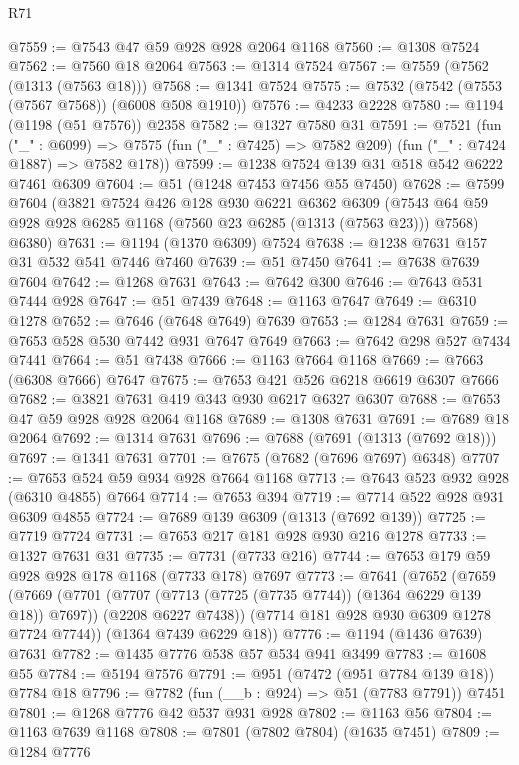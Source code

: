 \begin{lexlean}{R71}
\begin{coremodule}
@7559 := @7543 @47 @59 @928 @928 @2064 @1168
@7560 := @1308 @7524
@7562 := @7560 @18 @2064
@7563 := @1314 @7524
@7567 := @7559 (@7562 (@1313 (@7563 @18)))
@7568 := @1341 @7524
@7575 := @7532 (@7542 (@7553 (@7567 @7568)) (@6008 @508 @1910))
@7576 := @4233 @2228
@7580 := @1194 (@1198 (@51 @7576)) @2358
@7582 := @1327 @7580 @31
@7591 := @7521
    (fun ("_" : @6099) =>
    @7575 (fun ("_" : @7425) => @7582 @209) (fun ("_" : @7424 @1887) => @7582 @178))
@7599 := @1238 @7524 @139 @31 @518 @542 @6222 @7461 @6309
@7604 := @51 (@1248 @7453 @7456 @55 @7450)
@7628 := @7599
    @7604
    (@3821
      @7524
      @426
      @128
      @930
      @6221
      @6362
      @6309
      (@7543 @64 @59 @928 @928 @6285 @1168 (@7560 @23 @6285 (@1313 (@7563 @23))) @7568)
      @6380)
@7631 := @1194 (@1370 @6309) @7524
@7638 := @1238 @7631 @157 @31 @532 @541 @7446 @7460
@7639 := @51 @7450
@7641 := @7638 @7639 @7604
@7642 := @1268 @7631
@7643 := @7642 @300
@7646 := @7643 @531 @7444 @928
@7647 := @51 @7439
@7648 := @1163 @7647
@7649 := @6310 @1278
@7652 := @7646 (@7648 @7649) @7639
@7653 := @1284 @7631
@7659 := @7653 @528 @530 @7442 @931 @7647 @7649
@7663 := @7642 @298 @527 @7434 @7441
@7664 := @51 @7438
@7666 := @1163 @7664 @1168
@7669 := @7663 (@6308 @7666) @7647
@7675 := @7653 @421 @526 @6218 @6619 @6307 @7666
@7682 := @3821 @7631 @419 @343 @930 @6217 @6327 @6307
@7688 := @7653 @47 @59 @928 @928 @2064 @1168
@7689 := @1308 @7631
@7691 := @7689 @18 @2064
@7692 := @1314 @7631
@7696 := @7688 (@7691 (@1313 (@7692 @18)))
@7697 := @1341 @7631
@7701 := @7675 (@7682 (@7696 @7697) @6348)
@7707 := @7653 @524 @59 @934 @928 @7664 @1168
@7713 := @7643 @523 @932 @928 (@6310 @4855) @7664
@7714 := @7653 @394
@7719 := @7714 @522 @928 @931 @6309 @4855
@7724 := @7689 @139 @6309 (@1313 (@7692 @139))
@7725 := @7719 @7724
@7731 := @7653 @217 @181 @928 @930 @216 @1278
@7733 := @1327 @7631 @31
@7735 := @7731 (@7733 @216)
@7744 := @7653 @179 @59 @928 @928 @178 @1168 (@7733 @178) @7697
@7773 := @7641
    (@7652
      (@7659
        (@7669
          (@7701 (@7707 (@7713 (@7725 (@7735 @7744)) (@1364 @6229 @139 @18)) @7697))
          (@2208 @6227 @7438))
        (@7714 @181 @928 @930 @6309 @1278 @7724 @7744))
      (@1364 @7439 @6229 @18))
@7776 := @1194 (@1436 @7639) @7631
@7782 := @1435 @7776 @538 @57 @534 @941 @3499
@7783 := @1608 @55
@7784 := @5194 @7576
@7791 := @951 (@7472 (@951 @7784 @139 @18)) @7784 @18
@7796 := @7782 (fun (__b : @924) => @51 (@7783 @7791)) @7451
@7801 := @1268 @7776 @42 @537 @931 @928
@7802 := @1163 @56
@7804 := @1163 @7639 @1168
@7808 := @7801 (@7802 @7804) (@1635 @7451)
@7809 := @1284 @7776

\end{coremodule}
\end{lexlean}
